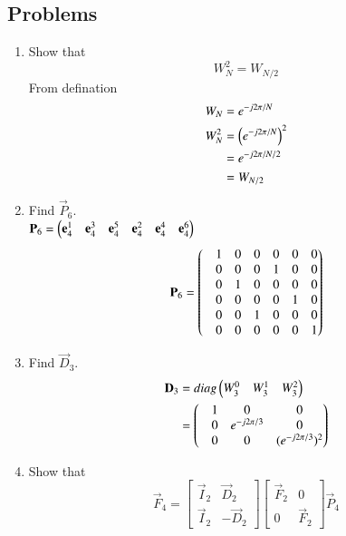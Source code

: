 \documentclass[journal,12pt,twocolumn]{IEEEtran}
\renewcommand\thesection{\arabic{section}}
\begin{document}
 \subsection{Problems}
\begin{enumerate}[label=\arabic*.,ref=\thesection.\theenumi]
\item Show that 
\begin{equation} \label{wwla}
    W_{N}^{2}=W_{N/2}
\end{equation}
\solution From defination
\begin{align}
	W_{N} &= e^{-j2\pi/N} \\
	W_{N}^2 &= \left(e^{-j2\pi/N}\right)^2\\
	&= e^{-j2\pi/N/2}\\
	&=W_{N/2}
\end{align}
\item Find $\vec{P}_6$.\\
\solution $\mathbf{P}_6 =\begin{pmatrix}\mathbf{e}_4^{1} &\mathbf{e}_4^{3} &\mathbf{e}_4^{5} &\mathbf{e}_4^{2} &\mathbf{e}_4^{4} &\mathbf{e}_4^{6}\end{pmatrix}$\\
\begin{equation}
	\mathbf{P}_6= \begin{pmatrix}&1 &0 &0 &0 &0 &0 \\&0 &0 &0 &1 &0 &0 \\&0 &1 &0 &0 &0 &0  \\&0 &0 &0 &0 &1 &0 \\&0 &0 &1 &0 &0 &0 \\&0 &0 &0 &0 &0 &1 \end{pmatrix}
\end{equation}
\item Find $\vec{D}_3$.\\
\solution \begin{align}
	\mathbf{D}_3 &= diag\begin{pmatrix}W_{3}^{0} & W_{3}^{1} & W_{3}^{2}\end{pmatrix}\\
	& = \begin{pmatrix}&1 &0 &0\\&0 &e^{-j2\pi/3} &0\\&0 &0 &(e^{-j2\pi/3})^2\end{pmatrix}
\end{align}
\item Show that 
\begin{equation}
	\vec{F}_{4}=
\begin{bmatrix}
	\vec{I}_{2} & \vec{D}_{2} \\
\vec{I}_{2} & -\vec{D}_{2}
\end{bmatrix}
\begin{bmatrix}
\vec{F}_{2} & 0 \\
0 & \vec{F}_{2}
\end{bmatrix}
\vec{P}_{4} 
\end{equation}

\end{enumerate}
\end{document}
